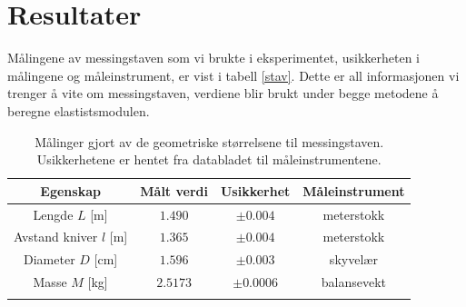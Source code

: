 \documentclass[%
 reprint,
 amsmath,amssymb,
 aps,
 norsk,
 booktabs
]{revtex4-1}
\begin{document}
\section{Resultater}
Målingene av messingstaven som vi brukte i eksperimentet, usikkerheten i målingene og måleinstrument, er vist i tabell \vref{stav}. Dette er all informasjonen vi trenger å vite om messingstaven, verdiene blir brukt under begge metodene å beregne elastistsmodulen.
\begin{table}[h!]
\centering
\caption{Målinger gjort av de geometriske størrelsene til messingstaven. Usikkerhetene er hentet fra databladet til måleinstrumentene.}
\label{stav}
\begin{tabular}{cccc}
    Egenskap & Målt verdi      &    Usikkerhet & Måleinstrument \\
    \toprule
    Lengde $L$ [m] & $1.490$    & $\pm 0.004$  & meterstokk  \\
    Avstand kniver $l$ [m] & $1.365$ & $\pm0.004$ & meterstokk \\
    Diameter $D$ [cm] & $1.596$    & $\pm0.003$ & skyvelær    \\
    Masse $M$    [kg]  & $2.5173$   & $\pm0.0006$   & balansevekt \\  \botrule
\end{tabular}
\end{table}
\end{document}
